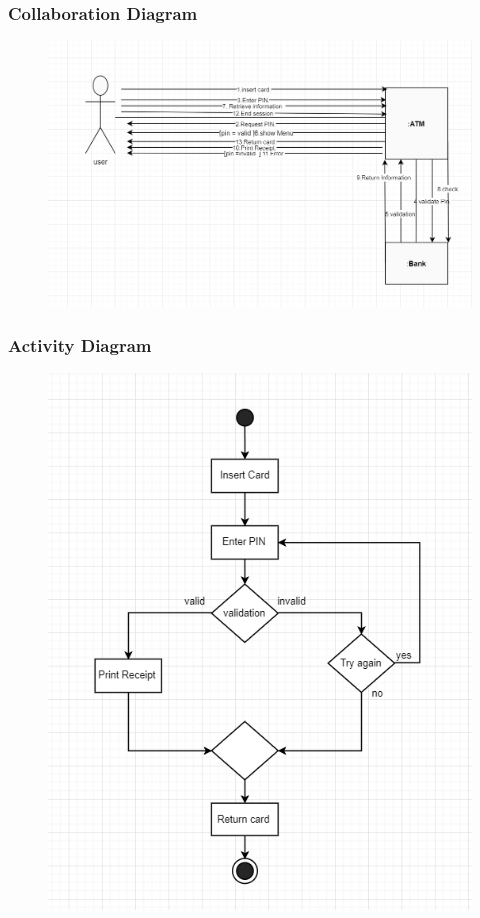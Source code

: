 \documentclass{article}
\begin{document}
		\newpage\subsubsection{Collaboration Diagram}	
		\begin{figure}[h!]
		  \includegraphics[width=\linewidth]{img/inquiry_collaboration.png}
		\end{figure}

		\newpage\subsubsection{Activity Diagram}
		\begin{figure}[h!]
			\begin{center}
				\includegraphics[height=\linewidth]{img/inquiry_activity.png}
			\end{center}
		\end{figure}
\end{document}
